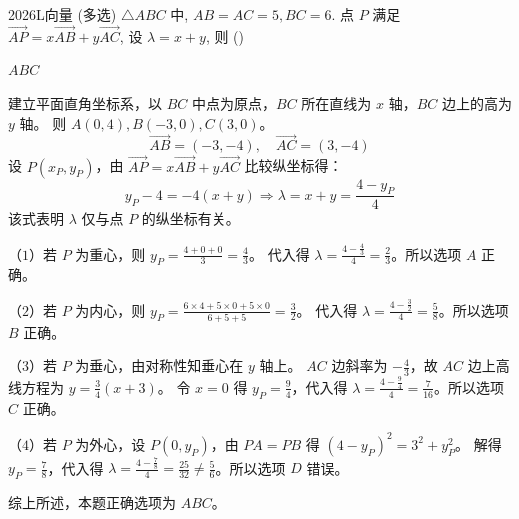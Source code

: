 \documentclass[12pt,UTF-8,a4paper]{ctexart}
\numberwithin{figure}{section}
\theoremstyle{mystyle}
\theoremstyle{mystylekaishu}
\theoremstyle{mystyle}
\numberwithin{xiti}{section}
\begin{document}

\begin{problem}{2026}{L}{}{}{向量}
(多选) $\triangle ABC$ 中, $AB=AC=5, BC=6$. 点 $P$ 满足 $\overrightarrow{AP}=x \overrightarrow{AB}+y \overrightarrow{AC}$, 设 $\lambda=x+y$, 则 (\hspace{1cm})
\begin{choices}
\end{choices}
\end{problem}

\begin{answer}
$ABC$
\end{answer}

\begin{solutions}
建立平面直角坐标系，以 $BC$ 中点为原点，$BC$ 所在直线为 $x$ 轴，$BC$ 边上的高为 $y$ 轴。
则 $A(0,4), B(-3,0), C(3,0)$。
$$
\overrightarrow{AB}=(-3,-4), \quad \overrightarrow{AC}=(3,-4)
$$
设 $P(x_P,y_P)$，由 $\overrightarrow{AP}=x \overrightarrow{AB}+y \overrightarrow{AC}$ 比较纵坐标得：
$$
y_P-4=-4(x+y) \Rightarrow \lambda=x+y=\frac{4-y_P}{4}
$$
该式表明 $\lambda$ 仅与点 $P$ 的纵坐标有关。

（$1$）若 $P$ 为重心，则 $y_P=\displaystyle\frac{4+0+0}{3}=\displaystyle\frac{4}{3}$。
代入得 $\lambda=\displaystyle\frac{4-\frac{4}{3}}{4}=\displaystyle\frac{2}{3}$。所以选项 $A$ 正确。

（$2$）若 $P$ 为内心，则 $y_P=\displaystyle\frac{6\times 4+5\times 0+5\times 0}{6+5+5}=\displaystyle\frac{3}{2}$。
代入得 $\lambda=\displaystyle\frac{4-\frac{3}{2}}{4}=\displaystyle\frac{5}{8}$。所以选项 $B$ 正确。

（$3$）若 $P$ 为垂心，由对称性知垂心在 $y$ 轴上。
$AC$ 边斜率为 $-\displaystyle\frac{4}{3}$，故 $AC$ 边上高线方程为 $y=\displaystyle\frac{3}{4}(x+3)$。
令 $x=0$ 得 $y_P=\displaystyle\frac{9}{4}$，代入得 $\lambda=\displaystyle\frac{4-\frac{9}{4}}{4}=\displaystyle\frac{7}{16}$。所以选项 $C$ 正确。

（$4$）若 $P$ 为外心，设 $P(0,y_P)$，由 $PA=PB$ 得 $(4-y_P)^2=3^2+y_P^2$。
解得 $y_P=\displaystyle\frac{7}{8}$，代入得 $\lambda=\displaystyle\frac{4-\frac{7}{8}}{4}=\displaystyle\frac{25}{32}\neq\displaystyle\frac{5}{6}$。所以选项 $D$ 错误。

综上所述，本题正确选项为 $ABC$。
\end{solutions}
\end{document}
